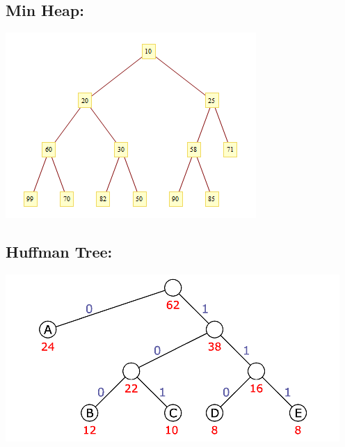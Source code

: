 	\subsection{Min Heap:}
	\begin{center}
		\includegraphics[scale=1.0]{min-heap.png}
	\end{center}
	\subsection{Huffman Tree:}
	\begin{center}
		\includegraphics[scale=1.0]{hufftree.png}
	\end{center}

